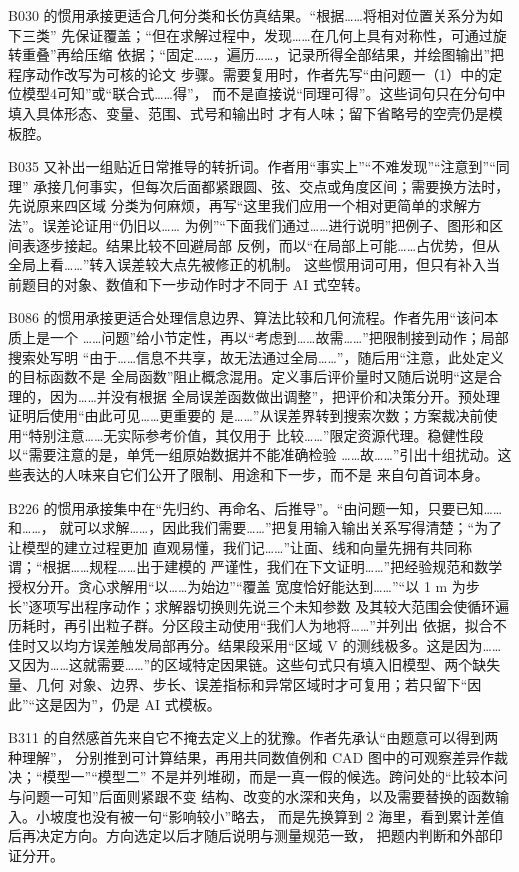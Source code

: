 B030 的惯用承接更适合几何分类和长仿真结果。“根据……将相对位置关系分为如下三类”
先保证覆盖；“但在求解过程中，发现……在几何上具有对称性，可通过旋转重叠”再给压缩
依据；“固定……，遍历……，记录所得全部结果，并绘图输出”把程序动作改写为可核的论文
步骤。需要复用时，作者先写“由问题一（1）中的定位模型4可知”或“联合式……得”，
而不是直接说“同理可得”。这些词句只在分句中填入具体形态、变量、范围、式号和输出时
才有人味；留下省略号的空壳仍是模板腔。

B035 又补出一组贴近日常推导的转折词。作者用“事实上”“不难发现”“注意到”“同理”
承接几何事实，但每次后面都紧跟圆、弦、交点或角度区间；需要换方法时，先说原来四区域
分类为何麻烦，再写“这里我们应用一个相对更简单的求解方法”。误差论证用“仍旧以……
为例”“下面我们通过……进行说明”把例子、图形和区间表逐步接起。结果比较不回避局部
反例，而以“在局部上可能……占优势，但从全局上看……”转入误差较大点先被修正的机制。
这些惯用词可用，但只有补入当前题目的对象、数值和下一步动作时才不同于 AI 式空转。

B086 的惯用承接更适合处理信息边界、算法比较和几何流程。作者先用“该问本质上是一个
……问题”给小节定性，再以“考虑到……故需……”把限制接到动作；局部搜索处写明
“由于……信息不共享，故无法通过全局……”，随后用“注意，此处定义的目标函数不是
全局函数”阻止概念混用。定义事后评价量时又随后说明“这是合理的，因为……并没有根据
全局误差函数做出调整”，把评价和决策分开。预处理证明后使用“由此可见……更重要的
是……”从误差界转到搜索次数；方案裁决前使用“特别注意……无实际参考价值，其仅用于
比较……”限定资源代理。稳健性段以“需要注意的是，单凭一组原始数据并不能准确检验
……故……”引出十组扰动。这些表达的人味来自它们公开了限制、用途和下一步，而不是
来自句首词本身。

B226 的惯用承接集中在“先归约、再命名、后推导”。“由问题一知，只要已知……和……，
就可以求解……，因此我们需要……”把复用输入输出关系写得清楚；“为了让模型的建立过程更加
直观易懂，我们记……”让面、线和向量先拥有共同称谓；“根据……规程……出于建模的
严谨性，我们在下文证明……”把经验规范和数学授权分开。贪心求解用“以……为始边”“覆盖
宽度恰好能达到……”“以 1 m 为步长”逐项写出程序动作；求解器切换则先说三个未知参数
及其较大范围会使循环遍历耗时，再引出粒子群。分区段主动使用“我们人为地将……”并列出
依据，拟合不佳时又以均方误差触发局部再分。结果段采用“区域 V 的测线极多。这是因为……
又因为……这就需要……”的区域特定因果链。这些句式只有填入旧模型、两个缺失量、几何
对象、边界、步长、误差指标和异常区域时才可复用；若只留下“因此”“这是因为”，仍是 AI
式模板。

B311 的自然感首先来自它不掩去定义上的犹豫。作者先承认“由题意可以得到两种理解”，
分别推到可计算结果，再用共同数值例和 CAD 图中的可观察差异作裁决；“模型一”“模型二”
不是并列堆砌，而是一真一假的候选。跨问处的“比较本问与问题一可知”后面则紧跟不变
结构、改变的水深和夹角，以及需要替换的函数输入。小坡度也没有被一句“影响较小”略去，
而是先换算到 2 海里，看到累计差值后再决定方向。方向选定以后才随后说明与测量规范一致，
把题内判断和外部印证分开。

